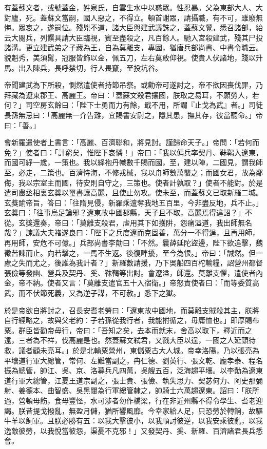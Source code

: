 \begin{pinyinscope}
 有蓋蘇文者，或號蓋金，姓泉氏，自雲生水中以惑眾。性忍暴。父為東部大人、大對廬，死。蓋蘇文當嗣，國人惡之，不得立。頓首謝眾，請攝職，有不可，雖廢無悔。眾哀之，遂嗣位。殘兇不道，諸大臣與建武議誅之，蓋蘇文覺，悉召諸部，紿云大閱兵，列饌具請大臣臨視，賓至盡殺之，凡百餘人。馳入宮殺建武，殘其尸投諸溝。更立建武弟之子藏為王，自為莫離支，專國，猶唐兵部尚書、中書令職云。貌魁秀，美須髯，冠服皆飾以金，佩五刀，左右莫敢仰視。使貴人伏諸地，踐以升馬。出入陳兵，長呼禁切，行人畏竄，至投坑谷。



 帝聞建武為下所殺，惻然遣使者持節吊祭。或勸帝可遂討之，帝不欲因喪伐罪，乃拜藏為遼東郡王、高麗王。帝曰：「蓋蘇文殺君攘國，朕取之易耳，不願勞人，若何？」司空房玄齡曰：「陛下士勇而力有餘，戢不用，所謂『止戈為武』者。」司徒長孫無忌曰：「高麗無一介告難，宜賜書安尉之，隱其患，撫其存，彼當聽命。」帝曰：「善。」



 會新羅遣使者上書言：「高麗、百濟聯和，將見討。謹歸命天子。」帝問：「若何而免？」使者曰：「計窮矣，惟陛下哀憐！」帝曰：「我以偏兵率契丹、靺鞨入遼東，而國可紓一歲，一策也。我以絳袍丹幟數千賜而國，至，建以陣，二國見，謂我師至，必走，二策也。百濟恃海，不修戎械，我以舟師數萬襲之；而國女君，故為鄰侮，我以宗室主而國，待安則自守之，三策也。使者計孰取？」使者不能對。於是遣司農丞相裏玄獎以璽書讓高麗，且使止勿攻。使未至，而蓋蘇文已取新羅二城。玄獎諭帝旨，答曰：「往隋見侵，新羅乘邅奪我地五百里，今非盡反地，兵不止。」玄獎曰：「往事烏足論邪？遼東故中國郡縣，天子且不取，高麗焉得違詔？」不從。玄獎還奏，帝曰：「莫離支殺君，虐用其下如擭阱，怨痛溢道，我出師無名哉？」諫議大夫褚遂良曰：「陛下之兵度遼而克固善，萬分一不得逞，且再用師，再用師，安危不可億。」兵部尚書李勣曰：「不然。曩薛延陀盜邊，陛下欲追擊，魏徵苦諫而止。向若擊之，一馬不生返。後復畔擾，至今為恨。」帝曰：「誠然。但一慮之失而尤之，後誰為我計者？」新羅數請援，乃下吳船四百柁輸糧，詔營州都督張儉等發幽、營兵及契丹、奚、靺鞨等出討。會遼溢，師還。莫離支懼，遣使者內金，帝不納。使者又言：「莫離支遣官五十入宿衛。」帝怒責使者曰：「而等委質高武，而不伏節死義，又為逆子謀，不可赦。」悉下之獄。



 於是帝欲自將討之，召長安耆老勞曰：「遼東故中國地，而莫離支賊殺其主，朕將自行經略之，故與父老約：子若孫從我行者，我能拊循之，毋庸恤也。」即厚賜布粟。群臣皆勸帝毋行，帝曰：「吾知之矣，去本而就末，舍高以取下，釋近而之遠，三者為不祥，伐高麗是也。然蓋蘇文弒君，又戮大臣以逞，一國之人延頸待救，議者顧未亮耳。」於是北輸粟營州，東儲粟古大人城。帝幸洛陽，乃以張亮為平壤道行軍大總管，常何、左難當副之，冉仁德、劉英行、張文乾、龐孝泰、程名振為總管，帥江、吳、京、洛募兵凡四萬，吳艘五百，泛海趨平壤。以李勣為遼東道行軍大總管，江夏王道宗副之，張士貴、張儉、執失思力、契苾何力、阿史那彌射、姜德本、曲智盛、吳黑闥為行軍總管隸之，帥騎士六萬趨遼東。詔曰：「朕所過，營頓毋飭，食毋豐怪，水可涉者勿作橋梁，行在非近州縣不得令學生、耆老迎謁。朕昔提戈撥亂，無盈月儲，猶所響風靡。今幸家給人足，只恐勞於轉餉，故驅牛羊以飼軍。且朕必勝有五：以我大擊彼小，以我順討彼逆，以我安乘彼亂，以我逸敵彼勞，以我悅當彼怨，渠憂不克邪！」又發契丹、奚、新羅、百濟諸君長兵悉會。




\end{pinyinscope}
